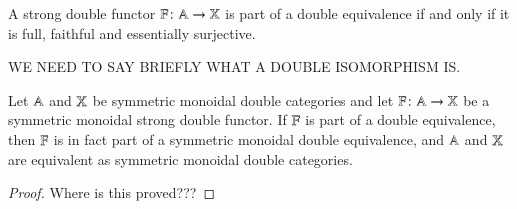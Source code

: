 \documentclass[reqno]{amsart}
\begin{document}
\begin{thm}{\cite[Thm.\ 7.8]{Shulman2010}}
\label{ShulDubEquiv}
A strong double functor $\mathbf{\mathbb F} \colon \mathbf{\mathbb A} \to \mathbf{\mathbb X}$ is part of a double equivalence if and only if it is full, faithful and essentially surjective.
\end{thm}

WE NEED TO SAY BRIEFLY WHAT A DOUBLE ISOMORPHISM IS.

\begin{thm}
Let $\mathbf{\mathbb A}$ and $\mathbf{\mathbb X}$ be symmetric monoidal double categories and let $\mathbf{\mathbb F} \colon \mathbf{\mathbb A} \to \mathbf{\mathbb X}$ be a symmetric monoidal strong double functor. If $\mathbf{\mathbb F}$ is part of a double equivalence, then $\mathbf{\mathbb F}$ is in fact part of a symmetric monoidal double equivalence, and $\mathbf{\mathbb A}$ and $\mathbf{\mathbb X}$ are equivalent as symmetric monoidal double categories.
\end{thm}

\begin{proof} Where is this proved???  \end{proof}
\end{document}
